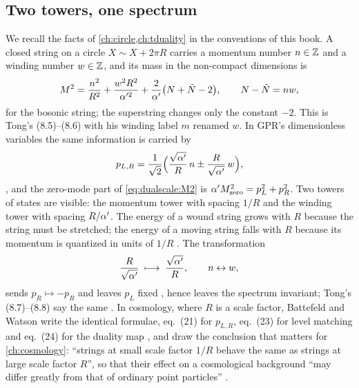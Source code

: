 \subsection{Two towers, one spectrum}

We recall the facts of \cref{ch:circle,ch:tduality} in the conventions of this book. A closed
string on a circle $X\sim X+2\pi R$ carries a momentum number $n\in\mathbb{Z}$ and a winding number
$w\in\mathbb{Z}$, and its mass in the non-compact dimensions is
\begin{equation}\label{eq:dualscale:M2}
 M^2=\frac{n^2}{R^2}+\frac{w^2R^2}{\alpha'^2}+\frac{2}{\alpha'}\big(N+\tilde N-2\big),\qquad
 N-\tilde N=nw,
\end{equation}
for the bosonic string; the superstring changes only the constant $-2$. This is Tong's
(8.5)--(8.6)  with his winding label $m$ renamed $w$. In
GPR's dimensionless variables the same information is carried by
\begin{equation}\label{eq:dualscale:pLpR}
 p_{L,R}=\frac1{\sqrt2}\Big(\frac{\sqrt{\alpha'}}{R}\,n\pm\frac{R}{\sqrt{\alpha'}}\,w\Big),
\end{equation}
, and the zero-mode part of \eqref{eq:dualscale:M2}
is $\alpha' M^2_{\rm zero}=p_L^2+p_R^2$. Two towers of states are visible: the momentum tower with
spacing $1/R$ and the winding tower with spacing $R/\alpha'$. The energy of a wound string grows
with $R$ because the string must be stretched; the energy of a moving string falls with $R$
because its momentum is quantized in units of $1/R$ . The
transformation
\begin{equation}\label{eq:dualscale:Tmap}
 \frac{R}{\sqrt{\alpha'}}\;\longmapsto\;\frac{\sqrt{\alpha'}}{R},\qquad n\leftrightarrow w,
\end{equation}
sends $p_R\mapsto-p_R$ and leaves $p_L$ fixed ,
hence leaves the spectrum invariant; Tong's (8.7)--(8.8) say the same
. In cosmology, where $R$ is a scale factor, Battefeld and
Watson write the identical formulae, eq.~(21) for $p_{L,R}$, eq.~(23) for level matching and
eq.~(24) for the duality map , and draw the conclusion that
matters for \cref{ch:cosmology}: ``strings at small scale factor $1/R$ behave the same as
strings at large scale factor $R$'', so that their effect on a cosmological background ``may
differ greatly from that of ordinary point particles'' .

